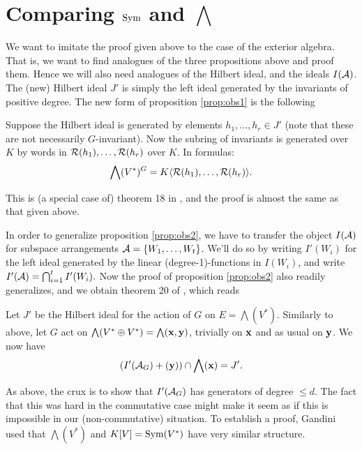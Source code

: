 \documentclass[../main.tex]{subfiles}
\begin{document}
\section{Comparing $\operatorname{Sym}$ and $\bigwedge$}
We want to imitate the proof given above to the case of the exterior algebra. 
That is, we want to find analogues of the three propositions above and
proof them. Hence we will also need analogues of the Hilbert ideal, and the 
ideals $I(\mathcal{A})$.
The (new) Hilbert ideal $J'$ is simply the left ideal generated by the
invariants of positive degree.
The new form of proposition \ref{prop:obs1} is the following
\begin{prop}\label{prop:newobs1}
    Suppose the Hilbert ideal is generated by elements $h_1, \dots, h_r \in J'$ 
    (note that these are not necessarily $G$-invariant). Now the subring of invariants
    is generated over $K$ by words in $\mathcal{R}(h_1), \dots, \mathcal{R}(h_r)$ over $K$. In formulas:
    \begin{equation*}
        \bigwedge(V^*)^G = K\langle\mathcal{R}(h_1), \dots, \mathcal{R}(h_r)\rangle.
    \end{equation*}
\end{prop}
This is (a special case of) theorem 18 in \cite{gandini2021degree}, and the proof
is almost the same as that given above.

In order to generalize proposition \ref{prop:obs2}, we have to transfer 
the object $I(\mathcal{A})$ for subspace arrangements $\mathcal{A} = \{W_1, \dots, W_t\}$. We'll 
do so by writing $I'(W_i)$ for the left ideal generated by the linear
(degree-1)-functions in $I(W_i)$, and write $I'(\mathcal{A}) = \bigcap_{i = 1}^t
I'(W_i).$ Now the proof of proposition \ref{prop:obs2} also readily
generalizes, and we obtain theorem 20 of \cite{gandini2021degree}, which reads
\begin{prop}
    Let $J'$ be the Hilbert ideal for the action of $G$ on $E = \bigwedge(V^*)$.
    Similarly to above, let $G$ act on $\bigwedge(V^* \oplus V^*) =
    \bigwedge(\mathbf{x}, \mathbf{y})$, trivially on $\mathbf{x}$ and as usual on $\mathbf{y}$. We now have
    \begin{equation*}
        (I'(\mathcal{A}_G) + (\mathbf{y})) \cap \bigwedge(\mathbf{x}) = J'.
    \end{equation*}
\end{prop}

As above, the crux is to show that $I'(\mathcal{A}_G)$ has generators of degree $\leq
d$. The fact that this was hard in the commutative case might make it seem as
if this is impossible in our (non-commutative) situation. To establish 
a proof, Gandini used that 
$\bigwedge(V^*)$ and $K[V] = \operatorname{Sym}(V^*)$ have very similar structure. 
\end{document}
